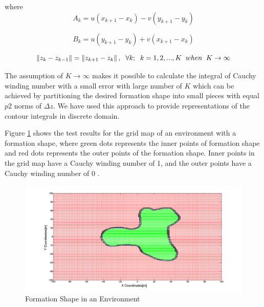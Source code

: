 where
\begin{equation}
A_k = u(x_{k+1} - x_k ) - v(y_{k+1} -y_k )
\end{equation}

\begin{equation}
B_k = u(y_{k+1} - y_k ) + v(x_{k+1} - x_k)
\end{equation}


\begin{equation}
\left\lVert z_k - z_{k-1}\right\rVert = \left\lVert z_{k+1} - z_k\right\rVert, \hspace{0.2cm}  \forall k ;  \hspace{0.2cm} k=1,2,...,K \hspace{0.2cm} when  \hspace{0.2cm} K \to\infty
\end{equation}

The assumption of $K \to\infty$ makes it possible to calculate the integral of Cauchy winding number with a small error with large number of $K$ which can be achieved by partitioning the desired formation shape  into small pieces with equal $p2$ norms of $\Delta z$. We have used this approach to provide representations of the contour integrals in discrete domain. 

Figure \ref{iceride_disarida_refe} shows the test results for the grid map of an environment with a formation shape, where green dots represents the inner points of formation shape and red dots represents the outer points of the formation shape. Inner points in the grid map have a Cauchy winding number of 1, and the outer points have a Cauchy winding number of 0 .

\begin{figure}[H]
\centering
\captionsetup{format=hang,justification=centerfirst}
\caption{Formation Shape in an Environment} \label{iceride_disarida_refe}
\includegraphics[scale = 0.28]{iceride_disarida}
\end{figure}

